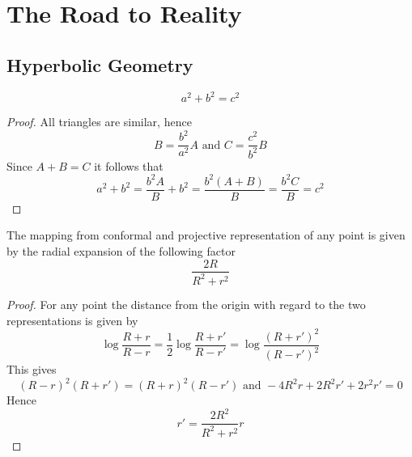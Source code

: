 
\newpage
\section{The Road to Reality}


\subsection{Hyperbolic Geometry}

\begin{theorem}[Pythagoras]\label{thm:thm_pythagoras}
\[
    a^2 + b^2 = c^2
\]
\end{theorem}


\begin{proof}
All triangles are similar, hence
\[
    B = \frac{b^2}{a^2} A \text{ and }  C =  \frac{c^2}{b^2} B 
\]
Since \( A + B = C \) it follows that
\[
     a^2 + b^2 = \frac{b^2A}{B} + b^2 = \frac{b^2(A + B)}{B} = \frac{b^2 C}{B} = c^2
\]
\end{proof}
\bigskip

%
%


The mapping from conformal and projective representation of any point is given by the radial expansion 
of the following factor
\[
   \frac{2R}{R^2 + r^2}
\]  

\begin{proof}
For any point the distance from the origin with regard to the two representations is given by
\[
    \log \frac{R + r}{R - r} = \frac{1}{2} \log \frac{R + r'}{R - r'} = \log \frac{(R + r')^2}{(R - r')^2}
\]
This gives
\[
  {(R - r)}^2 (R + r') = {(R + r)}^2 (R - r') \text{ and } -4R^2r + 2R^2r' + 2r^2r' = 0
\] 
Hence
\[
   r' = \frac{2R^2}{R^2 + r^2} r
\] 
\end{proof}


